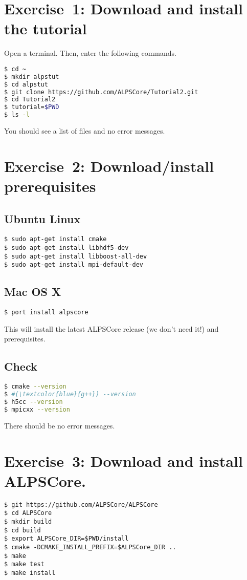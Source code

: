 \documentclass[12pt]{article}
\begin{document}
\section{Exercise~1: Download and install\\ the tutorial}

Open a terminal. Then, enter the following commands.

\begin{lstlisting}[language=sh,emph={ls,cd,mkdir,git}]
$ cd ~
$ mkdir alpstut
$ cd alpstut
$ git clone https://github.com/ALPSCore/Tutorial2.git
$ cd Tutorial2
$ tutorial=$PWD
$ ls -l
\end{lstlisting}

You should see a list of files and no error messages.

\section{Exercise~2: Download/install prerequisites}
\subsection{Ubuntu Linux}
\begin{lstlisting}[emph={sudo,apt,get}]
$ sudo apt-get install cmake
$ sudo apt-get install libhdf5-dev
$ sudo apt-get install libboost-all-dev
$ sudo apt-get install mpi-default-dev
\end{lstlisting}%
\subsection{Mac OS X}
\begin{lstlisting}[emph={port}]
$ port install alpscore
\end{lstlisting}%
This will install the latest ALPSCore release (we don't need it!)
and prerequisites.

\subsection{Check}
\begin{lstlisting}[language=sh,basicstyle=\ttfamily\small,emph={cmake,gcc,h5cc,mpicxx}]
$ cmake --version
$ #(\textcolor{blue}{g++}) --version
$ h5cc --version
$ mpicxx --version
\end{lstlisting}

There should be no error messages.

\section{Exercise~3: Download and install ALPSCore.}
\begin{lstlisting}[emph={git,export,cmake,make,cd,mkdir}]
$ git https://github.com/ALPSCore/ALPSCore
$ cd ALPSCore
$ mkdir build
$ cd build
$ export ALPSCore_DIR=$PWD/install
$ cmake -DCMAKE_INSTALL_PREFIX=$ALPSCore_DIR ..
$ make
$ make test
$ make install
\end{lstlisting}%
\end{document}
